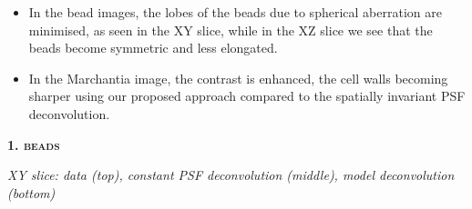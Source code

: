 \documentclass[a0paper,portrait,fontscale=0.35]{baposter}
\newcommand{\mycaption}[1]{
  {
    \smaller
    \emph{#1}
  }
}
\theoremstyle{plain}
\theoremstyle{plain}
\theoremstyle{definition}
\theoremstyle{plain}
\theoremstyle{definition}
\begin{document}
\begin{poster}
{\begin{minipage}[t]{0.33\textwidth}
    \begin{itemize}
      \item In the bead images, the lobes of the beads 
        due to spherical aberration are minimised, as seen
        in the XY slice, while in the XZ slice we see that
        the beads become symmetric and less elongated.

      \item In the Marchantia image, the contrast is 
        enhanced, the cell walls becoming sharper 
        using our proposed approach compared to the 
        spatially invariant PSF deconvolution.
    \end{itemize}

  \end{minipage}
  \begin{minipage}[t]{0.33\textwidth} 
    \begin{center}
      \larger
      \textbf{\textsc{1. beads}}
    \end{center}

    \vspace{-0.5em}
    \centering
    \begin{minipage}[t]{0.85\textwidth}
      \centering

      \vspace{-1em}
      \begin{center}
        \mycaption{
          XY slice: 
          data (top), constant PSF deconvolution (middle),
          model deconvolution (bottom)
        }
      \end{center}


\end{minipage}
\end{minipage}}
\end{poster}
\end{document}
